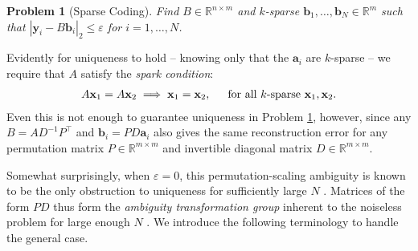 \documentclass[journal, twocolumn]{IEEEtran}
\newtheorem{problem}{Problem}
\begin{document}
\begin{problem}[Sparse Coding]\label{InverseProblem}
Find $B \in \mathbb{R}^{n \times m}$ and $k$-sparse $\mathbf{b}_1, \ldots, \mathbf{b}_N \in \mathbb{R}^m$ such that $|\mathbf{y}_i - B\mathbf{b}_i|_2 \leq \varepsilon$ for $i = 1, \ldots, N$.
\end{problem}


Evidently for uniqueness to hold -- knowing only that the $\mathbf{a}_i$ are $k$-sparse -- we require that $A$ satisfy the \textit{spark condition}:
\begin{align}\label{SparkCondition}
A\mathbf{x}_1 = A\mathbf{x}_2 \implies \mathbf{x}_1 = \mathbf{x}_2,\indent \text{for all $k$-sparse } \mathbf{x}_1, \mathbf{x}_2.
\end{align}
Even this is not enough to guarantee uniqueness in Problem \ref{InverseProblem}, however, since any $B = AD^{-1}P^{\top}$ and $\mathbf{b}_i = PD\mathbf{a}_i$ also gives the same reconstruction error for any permutation matrix $P \in \mathbb{R}^{m \times m}$ and invertible diagonal matrix $D \in \mathbb{R}^{m \times m}$. 

Somewhat surprisingly, when $\varepsilon = 0$, this permutation-scaling ambiguity is known to be the only obstruction to uniqueness for sufficiently large $N$ \cite{li2004analysis, Georgiev05, Aharon06, Hillar15}. Matrices of the form $PD$ thus form the \emph{ambiguity transformation group} inherent to the noiseless problem for large enough $N$ \cite{Li15}. We introduce the following terminology to handle the general case.
\end{document}
